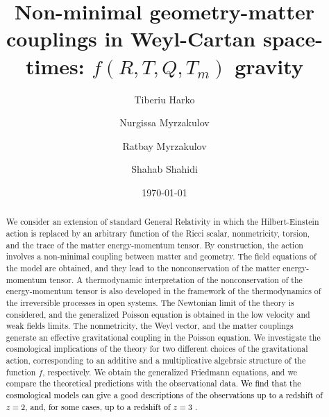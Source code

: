 \documentclass[aps,superscriptaddress, showpacs,preprintnumbers, superscriptaddress, nofootinbibt,twocolumn]{revtex4}
\newcommand{\te}[1]{\textcolor{black}{#1}}
\begin{document}
\title{Non-minimal geometry-matter couplings in Weyl-Cartan space-times: $f(R,T,Q,T_m)$ gravity }
\author{Tiberiu Harko}
\author{Nurgissa  Myrzakulov}
\author{Ratbay Myrzakulov}
\author{Shahab Shahidi}

\date{\today }

\begin{abstract}
We consider an extension of standard General Relativity in which the Hilbert-Einstein action is replaced by an arbitrary function of the Ricci scalar, nonmetricity, torsion, and the trace of the matter energy-momentum tensor. By construction, the action involves a non-minimal coupling between matter and geometry. The field equations of the model are obtained, and they lead to the nonconservation of the matter energy-momentum tensor. A thermodynamic interpretation of the nonconservation of the energy-momentum tensor is also developed in the framework of the thermodynamics of the irreversible processes in open systems. The Newtonian limit of the theory is considered, and the generalized Poisson equation is obtained in the low velocity and weak fields limits. The nonmetricity, the Weyl vector, and the matter couplings generate an effective gravitational coupling in the Poisson equation.  We investigate the cosmological implications of the theory for two different choices of the gravitational action, corresponding to an additive and a multiplicative algebraic structure of the function $f$, respectively. We obtain the generalized Friedmann equations, and we compare the theoretical predictions with the observational data. \te{We find that the cosmological models can give a good descriptions of the observations up to a redshift of $z=2$, and, for some cases, up to a redshift of $z=3$ .}
\end{abstract}
\maketitle
\tableofcontents
\end{document}
